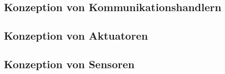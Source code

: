 \subsection{Konzeption von Kommunikationshandlern}\label{subsec:concept_communication}



\subsection{Konzeption von Aktuatoren}\label{subsec:concept_actuators}

\subsection{Konzeption von Sensoren}\label{subsec:concept_sensors}
